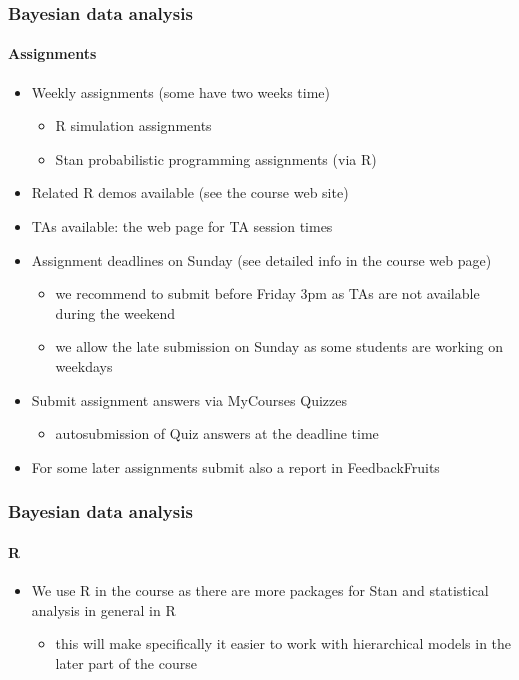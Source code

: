 \documentclass[english,t]{beamer}
\begin{document}
\begin{frame}
  \frametitle{Bayesian data analysis}  %
  \framesubtitle{Assignments}
  \begin{itemize}
  \item Weekly assignments (some have two weeks time)
    \begin{itemize}
    \item R simulation assignments
    \item Stan probabilistic programming assignments (via R)
    \end{itemize}
  \item Related R demos available (see the course web site)
  \item TAs available: the web page for TA session times
  \item Assignment deadlines on Sunday (see detailed info in the course web page)
    \begin{itemize}
    \item we recommend to submit before Friday 3pm as TAs are not
      available during the weekend
    \item we allow the late submission on Sunday as some students are
      working on weekdays
    \end{itemize}
  \item Submit assignment answers via MyCourses Quizzes
    \begin{itemize}
    \item autosubmission of Quiz answers at the deadline time
    \end{itemize}
  \item For some later assignments submit also a report in FeedbackFruits
  \end{itemize}
  
\end{frame}

\begin{frame}
  \frametitle{Bayesian data analysis}  %
  \framesubtitle{R}

  \begin{itemize}
  \item We use R in the course as there are more packages for Stan and
    statistical analysis in general in R
    \begin{itemize}
    \item this will make specifically it easier to work with
      hierarchical models in the later part of the course
    \end{itemize}
  \end{itemize}
  
\end{frame}
\end{document}

